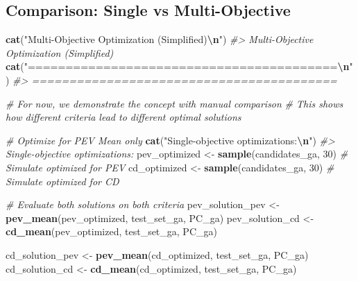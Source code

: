 \documentclass[
]{article}
\newenvironment{Shaded}{\begin{snugshade}}{\end{snugshade}}
\newcommand{\CommentTok}[1]{\textcolor[rgb]{0.56,0.35,0.01}{\textit{#1}}}
\newcommand{\DecValTok}[1]{\textcolor[rgb]{0.00,0.00,0.81}{#1}}
\newcommand{\FunctionTok}[1]{\textcolor[rgb]{0.13,0.29,0.53}{\textbf{#1}}}
\newcommand{\NormalTok}[1]{#1}
\newcommand{\OtherTok}[1]{\textcolor[rgb]{0.56,0.35,0.01}{#1}}
\newcommand{\SpecialCharTok}[1]{\textcolor[rgb]{0.81,0.36,0.00}{\textbf{#1}}}
\newcommand{\StringTok}[1]{\textcolor[rgb]{0.31,0.60,0.02}{#1}}
\begin{document}
\subsection{Comparison: Single vs
Multi-Objective}\label{comparison-single-vs-multi-objective}

\begin{Shaded}
\begin{Highlighting}[]
\FunctionTok{cat}\NormalTok{(}\StringTok{"Multi{-}Objective Optimization (Simplified)}\SpecialCharTok{\textbackslash{}n}\StringTok{"}\NormalTok{)}
\CommentTok{\#\textgreater{} Multi{-}Objective Optimization (Simplified)}
\FunctionTok{cat}\NormalTok{(}\StringTok{"=========================================}\SpecialCharTok{\textbackslash{}n}\StringTok{"}\NormalTok{)}
\CommentTok{\#\textgreater{} =========================================}

\CommentTok{\# For now, we demonstrate the concept with manual comparison}
\CommentTok{\# This shows how different criteria lead to different optimal solutions}

\CommentTok{\# Optimize for PEV Mean only}
\FunctionTok{cat}\NormalTok{(}\StringTok{"Single{-}objective optimizations:}\SpecialCharTok{\textbackslash{}n}\StringTok{"}\NormalTok{)}
\CommentTok{\#\textgreater{} Single{-}objective optimizations:}
\NormalTok{pev\_optimized }\OtherTok{\textless{}{-}} \FunctionTok{sample}\NormalTok{(candidates\_ga, }\DecValTok{30}\NormalTok{)  }\CommentTok{\# Simulate optimized for PEV}
\NormalTok{cd\_optimized }\OtherTok{\textless{}{-}} \FunctionTok{sample}\NormalTok{(candidates\_ga, }\DecValTok{30}\NormalTok{)   }\CommentTok{\# Simulate optimized for CD}

\CommentTok{\# Evaluate both solutions on both criteria}
\NormalTok{pev\_solution\_pev }\OtherTok{\textless{}{-}} \FunctionTok{pev\_mean}\NormalTok{(pev\_optimized, test\_set\_ga, PC\_ga)}
\NormalTok{pev\_solution\_cd }\OtherTok{\textless{}{-}} \FunctionTok{cd\_mean}\NormalTok{(pev\_optimized, test\_set\_ga, PC\_ga)}

\NormalTok{cd\_solution\_pev }\OtherTok{\textless{}{-}} \FunctionTok{pev\_mean}\NormalTok{(cd\_optimized, test\_set\_ga, PC\_ga)}
\NormalTok{cd\_solution\_cd }\OtherTok{\textless{}{-}} \FunctionTok{cd\_mean}\NormalTok{(cd\_optimized, test\_set\_ga, PC\_ga)}


\end{Highlighting}
\end{Shaded}
\end{document}
